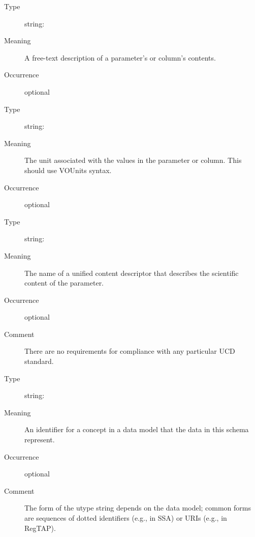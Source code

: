 \documentclass[11pt,a4paper]{ivoa}
\begin{document}
\begin{generated}
\begin{bigdescription}
\begin{description}
\end{description}
\item[Element \xmlel{description}]
\begin{description}
\item[Type] string: 
\item[Meaning] A free-text description of a parameter's or column's
                  contents.
\item[Occurrence] optional

\end{description}
\item[Element \xmlel{unit}]
\begin{description}
\item[Type] string: 
\item[Meaning] The unit associated with the values in the parameter
                  or column.  This should use VOUnits syntax.
\item[Occurrence] optional

\end{description}
\item[Element \xmlel{ucd}]
\begin{description}
\item[Type] string: 
\item[Meaning] The name of a unified content descriptor that
                  describes the scientific content of the parameter.
\item[Occurrence] optional
\item[Comment] There are no requirements for compliance with any
                  particular UCD standard.

\end{description}
\item[Element \xmlel{utype}]
\begin{description}
\item[Type] string: 
\item[Meaning] An identifier for a concept in a data model that
                  the data in this schema represent.
\item[Occurrence] optional
\item[Comment] The form of the utype string depends on the data
                  model; common forms are sequences of dotted identifiers
                  (e.g., in SSA) or URIs (e.g., in RegTAP).


\end{description}
\end{bigdescription}
\end{generated}
\end{document}
